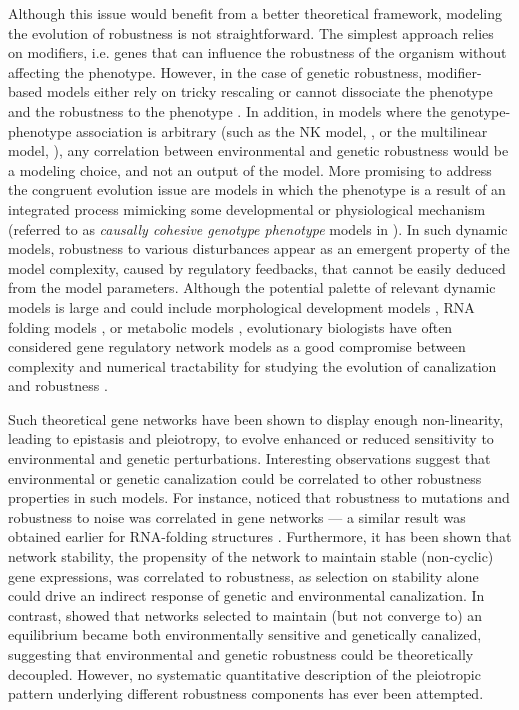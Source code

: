 \documentclass[10pt,a4paper]{article}
\begin{document}
Although this issue would benefit from a better theoretical framework, modeling the evolution of robustness is not straightforward. The simplest approach relies on modifiers, i.e. genes that can influence the robustness of the organism without affecting the phenotype. However, in the case of genetic robustness, modifier-based models either rely on tricky rescaling or cannot dissociate the phenotype and the robustness to the phenotype \citep{WBB97, Kaw00, RM13}. In addition, in models where the genotype-phenotype association is arbitrary (such as the NK model, \citealp{KL87}, or the multilinear model, \citealp{HW01}), any correlation between environmental and genetic robustness would be a modeling choice, and not an output of the model. More promising to address the congruent evolution issue are models in which the phenotype is a result of an integrated process mimicking some developmental or physiological mechanism (referred to as \emph{causally cohesive genotype phenotype} models in \cite{RGV08}). In such dynamic models, robustness to various disturbances appear as an emergent property of the model complexity, caused by regulatory feedbacks, that cannot be easily deduced from the model parameters. Although the potential palette of relevant dynamic models is large and could include morphological development models \citep{MS20}, RNA folding models \citep{WS99}, or metabolic models \citep{NBR19}, evolutionary biologists have often considered gene regulatory network models as a good compromise between complexity and numerical tractability for studying the evolution of canalization and robustness \citep{Kau69,Wag94,SBB00,LP12}.

Such theoretical gene networks have been shown to display enough non-linearity, leading to epistasis and pleiotropy, to evolve enhanced or reduced sensitivity to environmental \citep{Mas04,EMW11,EMW11b} and genetic \citep{Wag96,BS03,DW08,ALS+06,RL16} perturbations. Interesting observations suggest that environmental or genetic canalization could be correlated to other robustness properties in such models. For instance, \citet{CMW07,Kan07} noticed that robustness to mutations and robustness to noise was correlated in gene networks --- a similar result was obtained earlier for RNA-folding structures \citep{Fon02}. Furthermore, it has been shown that network stability, the propensity of the network to maintain stable (non-cyclic) gene expressions, was correlated to robustness, as selection on stability alone could drive an indirect response of genetic \citep{SB02} and environmental \citep{Mas04,NK20} canalization. In contrast, \citet{ORL18} showed that networks selected to maintain (but not converge to) an equilibrium became both environmentally sensitive and genetically canalized, suggesting that environmental and genetic robustness could be theoretically decoupled. However, no systematic quantitative description of the pleiotropic pattern underlying different robustness components has ever been attempted. 
\end{document}
